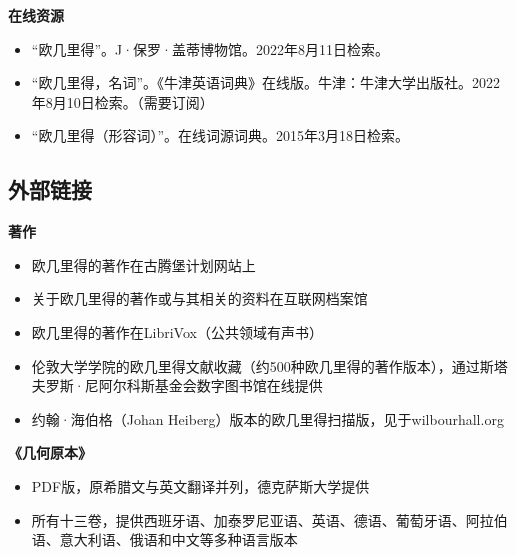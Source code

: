 \textbf{在线资源}  
\begin{itemize}
\item “欧几里得”。J·保罗·盖蒂博物馆。2022年8月11日检索。  
\item “欧几里得，名词”。《牛津英语词典》在线版。牛津：牛津大学出版社。2022年8月10日检索。（需要订阅）  
\item “欧几里得（形容词）”。在线词源词典。2015年3月18日检索。
\end{itemize}
\subsection{外部链接}
\textbf{著作}  
\begin{itemize}
\item 欧几里得的著作在古腾堡计划网站上  
\item 关于欧几里得的著作或与其相关的资料在互联网档案馆  
\item 欧几里得的著作在LibriVox（公共领域有声书）  
\item 伦敦大学学院的欧几里得文献收藏（约500种欧几里得的著作版本），通过斯塔夫罗斯·尼阿尔科斯基金会数字图书馆在线提供  
\item 约翰·海伯格（Johan Heiberg）版本的欧几里得扫描版，见于wilbourhall.org 
\end{itemize} 
\textbf{《几何原本》}  
\begin{itemize}
\item PDF版，原希腊文与英文翻译并列，德克萨斯大学提供  
\item 所有十三卷，提供西班牙语、加泰罗尼亚语、英语、德语、葡萄牙语、阿拉伯语、意大利语、俄语和中文等多种语言版本
\end{itemize}